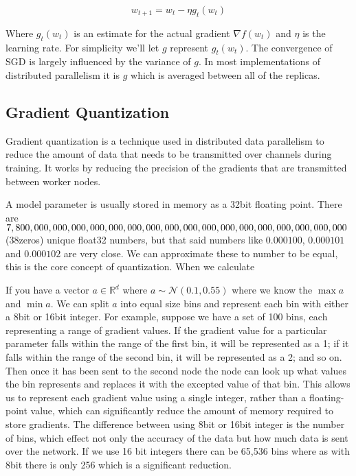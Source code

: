 \documentclass[11pt]{article}
\begin{document}
$$
w_{t+1} = w_t - \eta g_t(w_t)
$$

Where $g_t(w_t)$ is an estimate for the actual gradient ${\nabla} f(w_t)$ and $\eta$ is the learning rate. For simplicity we'll let $g$ represent $g_t(w_t)$. The convergence of SGD is largely influenced by the variance of $g$. In most implementations of distributed parallelism it is $g$ which is averaged between all of the replicas.


\subsection{Gradient Quantization}
Gradient quantization is a technique used in distributed data parallelism to reduce the amount of data that needs to be transmitted over channels during training. It works by reducing the precision of the gradients that are transmitted between worker nodes.

A model parameter is usually stored in memory as a 32bit floating point. There are $7, 800, 000, 000,\\ 000, 000,000,000,000,000,000,000,000,000,000,000,000,000,000$(38zeros) unique float32 numbers, but that said numbers like $0.000100$, $0.000101$ and $0.000102$ are very close. We can approximate these to number to be equal, this is the core concept of quantization. When we calculate 

If you have a vector $a \in \mathbb{R}^d$ where $a \sim \mathcal{N}(0.1,0.55)$ where we know the $\max a$ and $\min a$. We can split $a$ into equal size bins and represent each bin with either a 8bit or 16bit integer. For example, suppose we have a set of 100 bins, each representing a range of gradient values. If the gradient value for a particular parameter falls within the range of the first bin, it will be represented as a 1; if it falls within the range of the second bin, it will be represented as a 2; and so on. Then once it has been sent to the second node the node can look up what values the bin represents and replaces it with the excepted value of that bin. This allows us to represent each gradient value using a single integer, rather than a floating-point value, which can significantly reduce the amount of memory required to store gradients. The difference between using 8bit or 16bit integer is the number of bins, which effect not only the accuracy of the data but how much data is sent over the network. If we use 16 bit integers there can be 65,536 bins where as with 8bit there is only 256 which is a significant reduction.
\end{document}
